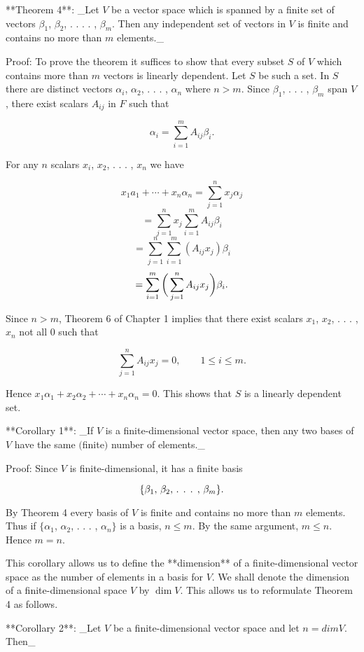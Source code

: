 

**Theorem 4**: _Let \(V\) be a vector space which is spanned by a finite set of vectors \(\beta_{1}\), \(\beta_{2}\), . . . . , \(\beta_{m}\). Then any independent set of vectors in \(V\) is finite and contains no more than \(m\) elements._

Proof: To prove the theorem it suffices to show that every subset \(S\) of \(V\) which contains more than \(m\) vectors is linearly dependent. Let \(S\) be such a set. In \(S\) there are distinct vectors \(\alpha_{i}\), \(\alpha_{2}\), . . . , \(\alpha_{n}\) where \(n>m\). Since \(\beta_{1}\), . . . , \(\beta_{m}\) span \(V\), there exist scalars \(A_{ij}\) in \(F\) such that

\[\alpha_{i}=\sum\limits_{i=1}^{m}A_{ij}\beta_{i}.\]

For any \(n\) scalars \(x_{i}\), \(x_{2}\), . . . , \(x_{n}\) we have

\[x_{1}a_{1}+\cdots+x_{n}\alpha_{n} =\sum\limits_{j=1}^{n}x_{j}\alpha_{j}\] \[=\sum\limits_{j=1}^{n}x_{j}\sum\limits_{i=1}^{m}A_{ij}\beta_{i}\] \[=\sum\limits_{j=1}^{n}\sum\limits_{i=1}^{m}(A_{ij}x_{j})\beta_{i}\] \[=\sum\limits_{i=1}^{m}\bigg{(}\sum\limits_{j=1}^{n}A_{ij}x_{j} \bigg{)}\beta_{i}.\]

Since \(n>m\), Theorem 6 of Chapter 1 implies that there exist scalars \(x_{1}\), \(x_{2}\), . . . , \(x_{n}\) not all \(0\) such that

\[\sum\limits_{j=1}^{n}A_{ij}x_{j}=0,\qquad 1\leq i\leq m.\]

Hence \(x_{1}\alpha_{1}+x_{2}\alpha_{2}+\cdots+x_{n}\alpha_{n}=0\). This shows that \(S\) is a linearly dependent set.

**Corollary 1**: _If \(V\) is a finite-dimensional vector space, then any two bases of \(V\) have the same \((\)finite\()\) number of elements._

Proof: Since \(V\) is finite-dimensional, it has a finite basis

\[\{\beta_{1}\), \(\beta_{2}\), . . . , \(\beta_{m}\}.\]

By Theorem 4 every basis of \(V\) is finite and contains no more than \(m\) elements. Thus if \(\{\alpha_{1}\), \(\alpha_{2}\), . . . , \(\alpha_{n}\}\) is a basis, \(n\leq m\). By the same argument, \(m\leq n\). Hence \(m=n\).

This corollary allows us to define the **dimension** of a finite-dimensional vector space as the number of elements in a basis for \(V\). We shall denote the dimension of a finite-dimensional space \(V\) by \(\dim\)\(V\). This allows us to reformulate Theorem 4 as follows.

**Corollary 2**: _Let \(V\) be a finite-dimensional vector space and let \(n=dim\)\(V\). Then_